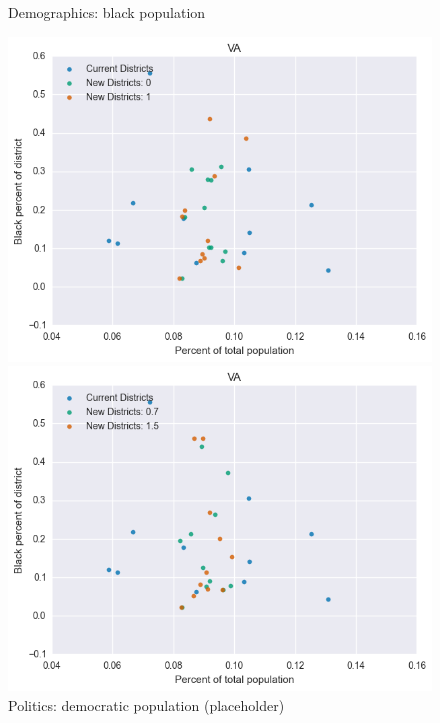 \begin{figure}[htb!] \centering
\caption{ Demographics: black population }
\includegraphics[width=4.5in]{../analysis/VA/analysis_scatter.png}
\caption{ Politics: democratic population (placeholder)}
\includegraphics[width=4.5in]{../analysis/VA/analysis_scatter2.png}
\end{figure}

\clearpage
\newpage

